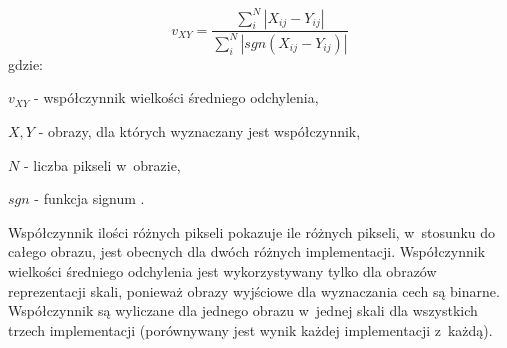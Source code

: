 \begin{equation}
\label{eq:sredniaOdchylenia}
v_{XY} = \frac{\sum_{i}^{N}|X_{ij}-Y_{ij}|}{\sum_{i}^{N}|sgn(X_{ij}-Y_{ij})|}
\end{equation}
gdzie:

$ v_{XY} $ - współczynnik wielkości średniego odchylenia,

$ X, Y $ - obrazy, dla których wyznaczany jest współczynnik,

$ N $ - liczba pikseli w~obrazie,

$ sgn $ - funkcja signum \cite{Signum}.

Współczynnik ilości różnych pikseli pokazuje ile różnych pikseli, w~stosunku do całego obrazu, jest obecnych dla dwóch różnych implementacji. Współczynnik wielkości średniego odchylenia jest wykorzystywany tylko dla obrazów reprezentacji skali, ponieważ obrazy wyjściowe dla wyznaczania cech są binarne. Współczynnik są wyliczane dla jednego obrazu w~jednej skali dla wszystkich trzech implementacji (porównywany jest wynik każdej implementacji z~każdą).
